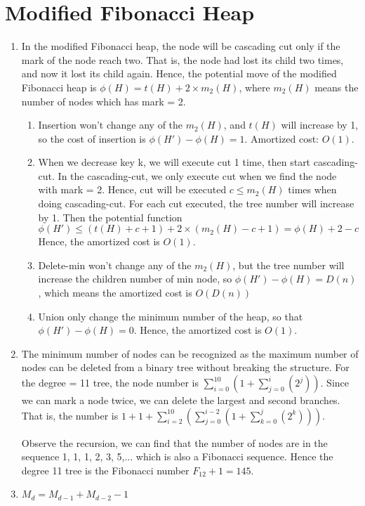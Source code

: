 \documentclass[12pt,a4paper]{article}
\begin{document}
\section{Modified Fibonacci Heap}

\begin{enumerate}
    \item [(a)] 
        In the modified Fibonacci heap, the node will be cascading cut only if the mark of the node reach two.
        That is, the node had lost its child two times, and now it lost its child again.
        Hence, the potential move of the modified Fibonacci heap is $\phi(H) = t(H)+2\times m_{2}(H)$, where $m_{2}(H)$ means the number of nodes which has mark = 2.
        \begin{enumerate}
            \item [i.] 
                Insertion won't change any of the $m_{2}(H)$, and $t(H)$ will increase by 1, so the cost of insertion is $\phi(H') - \phi(H) = 1$. Amortized cost: $O(1)$.
            \item [ii.]
                When we decrease key k, we will execute cut 1 time, then start cascading-cut.
                In the cascading-cut, we only execute cut when we find the node with mark = 2. Hence, cut will be executed $c \leq m_{2}(H)$ times when doing cascading-cut.
                For each cut executed, the tree number will increase by 1.
                Then the potential function $$\phi(H') \leq (t(H) + c + 1) + 2\times (m_{2}(H) - c + 1) = \phi(H) + 2 - c$$
                Hence, the amortized cost is $O(1)$.
            \item [iii.] 
                Delete-min won't change any of the $m_{2}(H)$, but the tree number will increase the children number of min node, so
                $\phi(H') - \phi(H) = D(n)$, which means the amortized cost is $O(D(n))$
            \item [iv.]
                Union only change the minimum number of the heap, so that $\phi(H') - \phi(H) = 0$. Hence, the amortized cost is $O(1)$.
        \end{enumerate}
    \newpage
    \item [(b)]
        The minimum number of nodes can be recognized as the maximum number of nodes can be deleted from a binary tree without breaking the structure.
        For the degree = 11 tree, the node number is $\sum_{i=0}^{10}(1 + \sum_{j=0}^{i}(2^j))$. Since we can mark a node twice, we can delete the largest and second branches.
        That is, the number is $1 + 1 + \sum_{i=2}^{10}(\sum_{j=0}^{i-2}(1+\sum_{k=0}^{j}(2^k)))$.

        Observe the recursion, we can find that the number of nodes are in the sequence 1, 1, 1, 2, 3, 5,... which is also a Fibonacci sequence.
        Hence the degree 11 tree is the Fibonacci number $F_{12} + 1 = 145$.
    \item [(c)]
        $M_{d} = M_{d-1} + M_{d-2} - 1$
\end{enumerate}
\end{document}
